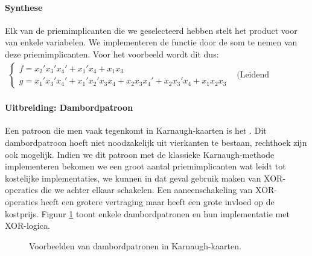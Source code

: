 \paragraph{Synthese}
Elk van de priemimplicanten die we geselecteerd hebben stelt het product voor van enkele variabelen. We implementeren de functie door de som te nemen van deze priemimplicanten. Voor het voorbeeld wordt dit dus:
\begin{equation}
\begin{array}{ll}
\left\{
\begin{array}{l}
f=x_2'x_3'x_4'+x_1'x_4+x_1x_3\\
g=x_1'x_3'x_4'+x_1'x_2'x_3x_4+x_2x_3x_4'+x_2x_3'x_4+x_1x_2x_3
\end{array}\right.&\mbox{(Leidend voorbeeld)}
\end{array}
\end{equation}
\paragraph{Uitbreiding: Dambordpatroon}
Een patroon die men vaak tegenkomt in Karnaugh-kaarten is het . Dit dambordpatroon hoeft niet noodzakelijk uit vierkanten te bestaan, rechthoek zijn ook mogelijk. Indien we dit patroon met de klassieke Karnaugh-methode implementeren bekomen we een groot aantal priemimplicanten wat leidt tot kostelijke implementaties, we kunnen in dat geval gebruik maken van XOR-operaties die we achter elkaar schakelen. Een aaneenschakeling van XOR-operaties heeft een grotere vertraging maar heeft een grote invloed op de kostprijs. Figuur \ref{fig:dambordpatronen} toont enkele dambordpatronen en hun implementatie met XOR-logica.
\begin{figure}[hbt]
\centering
{}
\caption{Voorbeelden van dambordpatronen in Karnaugh-kaarten.}
\label{fig:dambordpatronen}
\end{figure}

